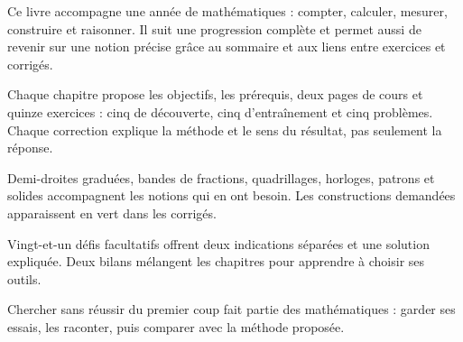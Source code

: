 \clearpage\thispagestyle{otFront}\label{avant-propos}\fontsize{11}{15}\selectfont

Ce livre accompagne une année de mathématiques : compter, calculer,
mesurer, construire et raisonner. Il suit une progression complète et
permet aussi de revenir sur une notion précise grâce au sommaire
et aux liens entre exercices et corrigés.\par\medskip
\begin{savoirfaire}Chaque chapitre propose les objectifs,
les prérequis, deux pages de cours et quinze exercices : cinq de découverte,
cinq d’entraînement et cinq problèmes. Chaque correction explique la
méthode et le sens du résultat, pas seulement la réponse.\end{savoirfaire}
\begin{savoirfaire}Demi-droites graduées, bandes de
fractions, quadrillages, horloges, patrons et solides accompagnent les
notions qui en ont besoin. Les constructions demandées apparaissent
en vert dans les corrigés.\end{savoirfaire}
\begin{savoirfaire}Vingt-et-un défis facultatifs offrent deux
indications séparées et une solution expliquée. Deux bilans mélangent
les chapitres pour apprendre à choisir ses outils.\end{savoirfaire}
Chercher sans réussir du premier coup fait partie des mathématiques :
garder ses essais, les raconter, puis comparer avec la méthode proposée.

\clearpage
